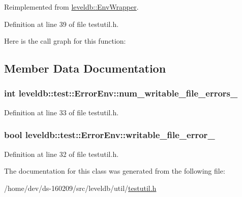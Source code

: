Reimplemented from \hyperlink{classleveldb_1_1_env_wrapper_a2d2b29a658e80c326ddaeb9c4d74c483}{leveldb\+::\+Env\+Wrapper}.



Definition at line 39 of file testutil.\+h.



Here is the call graph for this function\+:




\subsection{Member Data Documentation}
\hypertarget{classleveldb_1_1test_1_1_error_env_afa4564355d86107c8ed0d6efe53eadef}{}
\subsubsection[{num\+\_\+writable\+\_\+file\+\_\+errors\+\_\+}]{\setlength{\rightskip}{0pt plus 5cm}int leveldb\+::test\+::\+Error\+Env\+::num\+\_\+writable\+\_\+file\+\_\+errors\+\_\+}\label{classleveldb_1_1test_1_1_error_env_afa4564355d86107c8ed0d6efe53eadef}


Definition at line 33 of file testutil.\+h.

\hypertarget{classleveldb_1_1test_1_1_error_env_ae3593b752dff671f24f3637376e1cf22}{}
\subsubsection[{writable\+\_\+file\+\_\+error\+\_\+}]{\setlength{\rightskip}{0pt plus 5cm}bool leveldb\+::test\+::\+Error\+Env\+::writable\+\_\+file\+\_\+error\+\_\+}\label{classleveldb_1_1test_1_1_error_env_ae3593b752dff671f24f3637376e1cf22}


Definition at line 32 of file testutil.\+h.



The documentation for this class was generated from the following file\+:\begin{DoxyCompactItemize}
\item 
/home/dev/ds-\/160209/src/leveldb/util/\hyperlink{testutil_8h}{testutil.\+h}\end{DoxyCompactItemize}
